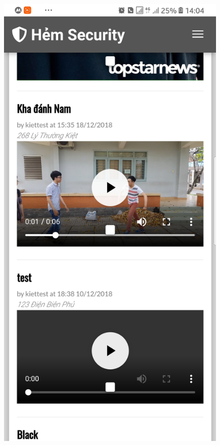 \begin{figure}[!htb]
  \includegraphics[width=\linewidth]{images/chap4/homepage_mb.jpg}
\endminipage\hfill
{}

\end{figure}
